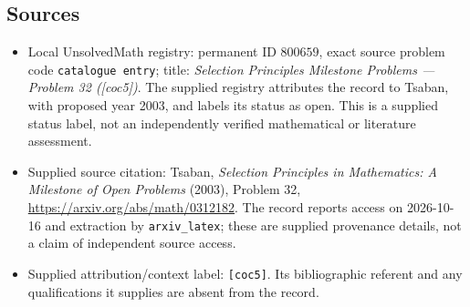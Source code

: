 \documentclass[11pt]{article}
\begin{document}
\subsection{Sources}
\begin{itemize}
\item Local UnsolvedMath registry: permanent ID \(800659\), exact source problem code \texttt{catalogue entry}; title: \emph{Selection Principles Milestone Problems --- Problem 32 ([coc5])}. The supplied registry attributes the record to Tsaban, with proposed year 2003, and labels its status as open. This is a supplied status label, not an independently verified mathematical or literature assessment.
\item Supplied source citation: Tsaban, \emph{Selection Principles in Mathematics: A Milestone of Open Problems} (2003), Problem 32, \url{https://arxiv.org/abs/math/0312182}. The record reports access on 2026-10-16 and extraction by \texttt{arxiv\_latex}; these are supplied provenance details, not a claim of independent source access.
\item Supplied attribution/context label: \texttt{[coc5]}. Its bibliographic referent and any qualifications it supplies are absent from the record.
\end{itemize}
\end{document}
